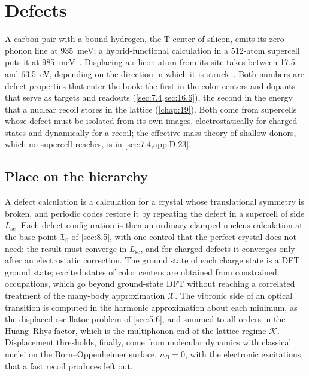 \section{Defects}\label{app:E.10}

A carbon pair with a bound hydrogen, the T center of silicon, emits its zero-phonon line at \SI{935}{meV}; a hybrid-functional calculation in a 512-atom supercell puts it at \SI{985}{meV}~\cite{dhaliah2022first}. Displacing a silicon atom from its site takes between 17.5 and \SI{63.5}{eV}, depending on the direction in which it is struck~\cite{kadribasic2018directional}. Both numbers are defect properties that enter the book: the first in the color centers and dopants that serve as targets and readouts (\cref{sec:7.4,sec:16.6}), the second in the energy that a nuclear recoil stores in the lattice (\cref{chap:19}). Both come from supercells whose defect must be isolated from its own images, electrostatically for charged states and dynamically for a recoil; the effective-mass theory of shallow donors, which no supercell reaches, is in \cref{sec:7.4,app:D.23}.

\subsection{Place on the hierarchy}

A defect calculation is a calculation for a crystal whose translational symmetry is broken, and periodic codes restore it by repeating the defect in a supercell of side $L_{\mathrm{sc}}$. Each defect configuration is then an ordinary clamped-nucleus calculation at the base point $\mathfrak{T}_0$ of \cref{sec:8.5}, with one control that the perfect crystal does not need: the result must converge in $L_{\mathrm{sc}}$, and for charged defects it converges only after an electrostatic correction. The ground state of each charge state is a DFT ground state; excited states of color centers are obtained from constrained occupations, which go beyond ground-state DFT without reaching a correlated treatment of the many-body approximation $\mathcal{X}$. The vibronic side of an optical transition is computed in the harmonic approximation about each minimum, as the displaced-oscillator problem of \cref{sec:5.6}, and summed to all orders in the Huang--Rhys factor, which is the multiphonon end of the lattice regime $\mathcal{K}$. Displacement thresholds, finally, come from molecular dynamics with classical nuclei on the Born--Oppenheimer surface, $n_B = 0$, with the electronic excitations that a fast recoil produces left out.

